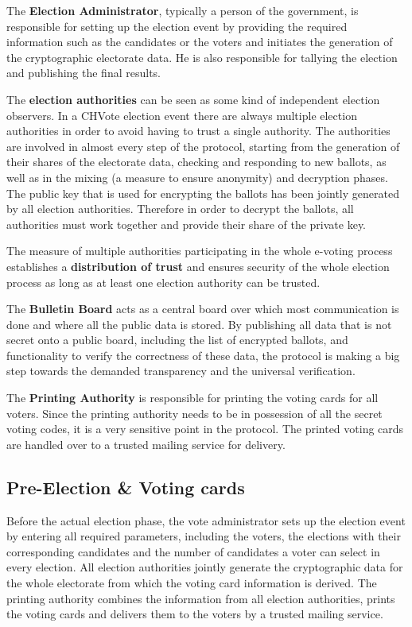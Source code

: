 The \textbf{Election Administrator}, typically a person of the government, is responsible for setting up the election event by providing the required information such as the candidates or the voters and initiates the generation of the cryptographic electorate data. He is also responsible for tallying the election and publishing the final results.

The \textbf{election authorities} can be seen as some kind of independent election observers. In a CHVote election event there are always multiple election authorities in order to avoid having to trust a single authority. The authorities are involved in almost every step of the protocol, starting from the generation of their shares of the electorate data, checking and responding to new ballots, as well as in the mixing (a measure to ensure anonymity) and decryption phases. The public key that is used for encrypting the ballots has been jointly generated by all election authorities. Therefore in order to decrypt the ballots, all authorities must work together and provide their share of the private key. 

The measure of multiple authorities participating in the whole e-voting process establishes a \textbf{distribution of trust} and ensures security of the whole election process as long as at least one election authority can be trusted.

The \textbf{Bulletin Board} acts as a central board over which most communication is done and where all the public data is stored. By publishing all data that is not secret onto a public board, including the list of encrypted ballots, and functionality to verify the correctness of these data, the protocol is making a big step towards the demanded transparency and the universal verification.

The \textbf{Printing Authority} is responsible for printing the voting cards for all voters. Since the printing authority needs to be in possession of all the secret voting codes, it is a very sensitive point in the protocol. The printed voting cards are handled over to a trusted mailing service for delivery.

\subsection{Pre-Election \& Voting cards}
Before the actual election phase, the vote administrator sets up the election event by entering all required parameters, including the voters, the elections with their corresponding candidates and the number of candidates a voter can select in every election. All election authorities jointly generate the cryptographic data for the whole electorate from which the voting card information is derived. The printing authority combines the information from all election authorities, prints the voting cards and delivers them to the voters by a trusted mailing service. 

